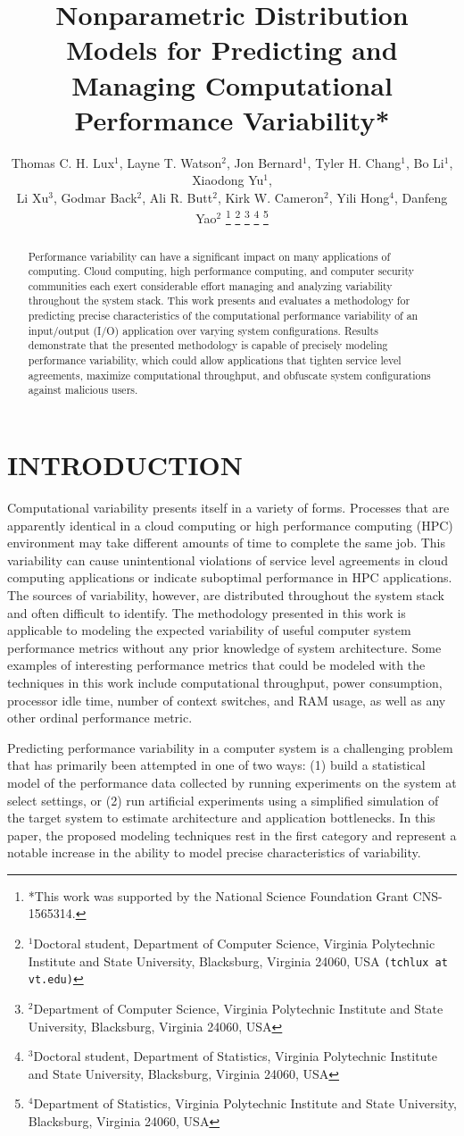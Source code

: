 \documentclass[letterpaper, 10 pt, conference]{ieeeconf}  %
\title{\LARGE \bf Nonparametric Distribution Models for Predicting and
  \\ Managing Computational Performance Variability* }
\author{Thomas C. H. Lux$^{1}$, Layne T. Watson$^{2}$, Jon Bernard$^{1}$, Tyler H. Chang$^{1}$, Bo Li$^{1}$, Xiaodong Yu$^{1}$,\\ Li Xu$^{3}$, Godmar Back$^{2}$, Ali R. Butt$^{2}$, Kirk W. Cameron$^{2}$, Yili Hong$^{4}$, Danfeng Yao$^{2}$%
\thanks{*This work was supported by the National Science Foundation Grant CNS-1565314.}%
\thanks{$^{1}$Doctoral student, Department of Computer Science, Virginia Polytechnic Institute and State University, Blacksburg, Virginia 24060, USA {\tt\small (tchlux at vt.edu)}}%
\thanks{$^{2}$Department of Computer Science, Virginia Polytechnic Institute and State University, Blacksburg, Virginia 24060, USA}%
\thanks{$^{3}$Doctoral student, Department of Statistics, Virginia Polytechnic Institute and State University, Blacksburg, Virginia 24060, USA}%
\thanks{$^{4}$Department of Statistics, Virginia Polytechnic Institute and State University, Blacksburg, Virginia 24060, USA}%
}
\begin{document}
\maketitle
\thispagestyle{empty}
\pagestyle{empty}

\begin{abstract}
Performance variability can have a significant impact on many applications of computing. Cloud computing, high performance computing, and computer security communities each exert considerable effort managing and analyzing variability throughout the system stack. This work presents and evaluates a methodology for predicting precise characteristics of the computational performance variability of an input/output (I/O) application over varying system configurations. Results demonstrate that the presented methodology is capable of precisely modeling performance variability, which could allow applications that tighten service level agreements, maximize computational throughput, and obfuscate system configurations against malicious users.
\end{abstract}

\section{INTRODUCTION}
\label{sec:introduction}

Computational variability presents itself in a variety of forms. Processes that are apparently identical in a cloud computing or high performance computing (HPC) environment may take different amounts of time to complete the same job. This variability can cause unintentional violations of service level agreements in cloud computing applications or indicate suboptimal performance in HPC applications. The sources of variability, however, are distributed throughout the system stack and often difficult to identify. The methodology presented in this work is applicable to modeling the expected variability of useful computer system performance metrics without any prior knowledge of system architecture. Some examples of interesting performance metrics that could be modeled with the techniques in this work include computational throughput, power consumption, processor idle time, number of context switches, and RAM usage, as well as any other ordinal performance metric.

Predicting performance variability in a computer system is a challenging problem that has primarily been attempted in one of two ways: (1) build a statistical model of the performance data collected by running experiments on the system at select settings, or (2) run artificial experiments using a simplified simulation of the target system to estimate architecture and application bottlenecks. In this paper, the proposed modeling techniques rest in the first category and represent a notable increase in the ability to model precise characteristics of variability.
\end{document}

